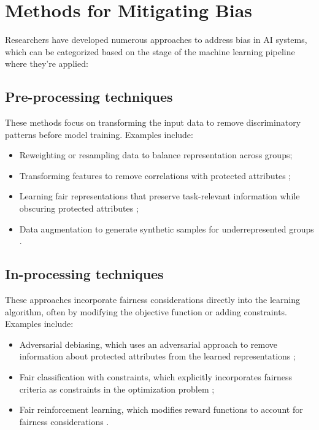 \documentclass[12pt,a4paper,openright,twoside]{book}
\begin{document}
\section{Methods for Mitigating Bias}
Researchers have developed numerous approaches to address bias in AI systems, which can be categorized based on the stage of the machine learning pipeline where they're applied:


\subsection{Pre-processing techniques}
These methods focus on transforming the input data to remove discriminatory patterns before model training. Examples include:
\begin{itemize}
    \item Reweighting or resampling data to balance representation across groups;
    \item Transforming features to remove correlations with protected attributes \cite{kamiran2013quantifying};
    \item Learning fair representations that preserve task-relevant information 
    while obscuring protected attributes \cite{mehrabi2021survey};
    \item Data augmentation to generate synthetic samples for underrepresented groups \cite{mehrabi2021survey}.
\end{itemize}
    

\subsection{In-processing techniques} 
These approaches incorporate fairness considerations directly into the learning algorithm, often by modifying the objective function or adding constraints. Examples include:
\begin{itemize}
    \item Adversarial debiasing, which uses an adversarial approach to remove information about protected attributes from the learned representations \cite{mehrabi2021survey};
    \item Fair classification with constraints, which explicitly incorporates fairness criteria as constraints in the optimization problem \cite{corbett2023measure};
    \item Fair reinforcement learning, which modifies reward functions to account for fairness considerations \cite{mehrabi2021survey}.
\end{itemize}
    
\end{document}
